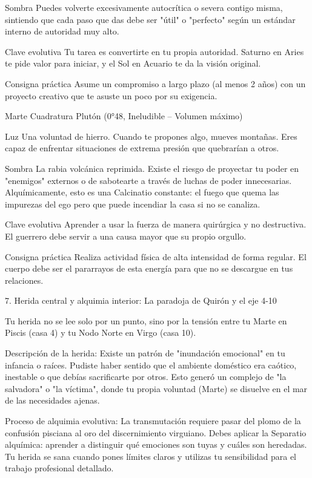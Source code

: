 Sombra Puedes volverte excesivamente autocrítica o severa contigo misma, sintiendo que cada paso que das debe ser "útil" o "perfecto" según un estándar interno de autoridad muy alto.

Clave evolutiva Tu tarea es convertirte en tu propia autoridad. Saturno en Aries te pide valor para iniciar, y el Sol en Acuario te da la visión original.

Consigna práctica Asume un compromiso a largo plazo (al menos 2 años) con un proyecto creativo que te asuste un poco por su exigencia.

Marte Cuadratura Plutón (0°48, Ineludible – Volumen máximo)

Luz Una voluntad de hierro. Cuando te propones algo, mueves montañas. Eres capaz de enfrentar situaciones de extrema presión que quebrarían a otros.

Sombra La rabia volcánica reprimida. Existe el riesgo de proyectar tu poder en "enemigos" externos o de sabotearte a través de luchas de poder innecesarias. Alquímicamente, esto es una Calcinatio constante: el fuego que quema las impurezas del ego pero que puede incendiar la casa si no se canaliza.

Clave evolutiva Aprender a usar la fuerza de manera quirúrgica y no destructiva. El guerrero debe servir a una causa mayor que su propio orgullo.

Consigna práctica Realiza actividad física de alta intensidad de forma regular. El cuerpo debe ser el pararrayos de esta energía para que no se descargue en tus relaciones.

7. Herida central y alquimia interior: La paradoja de Quirón y el eje 4-10

Tu herida no se lee solo por un punto, sino por la tensión entre tu Marte en Piscis (casa 4) y tu Nodo Norte en Virgo (casa 10).

Descripción de la herida: Existe un patrón de "inundación emocional" en tu infancia o raíces. Pudiste haber sentido que el ambiente doméstico era caótico, inestable o que debías sacrificarte por otros. Esto generó un complejo de "la salvadora" o "la víctima", donde tu propia voluntad (Marte) se disuelve en el mar de las necesidades ajenas.

Proceso de alquimia evolutiva: La transmutación requiere pasar del plomo de la confusión pisciana al oro del discernimiento virguiano. Debes aplicar la Separatio alquímica: aprender a distinguir qué emociones son tuyas y cuáles son heredadas. Tu herida se sana cuando pones límites claros y utilizas tu sensibilidad para el trabajo profesional detallado.

